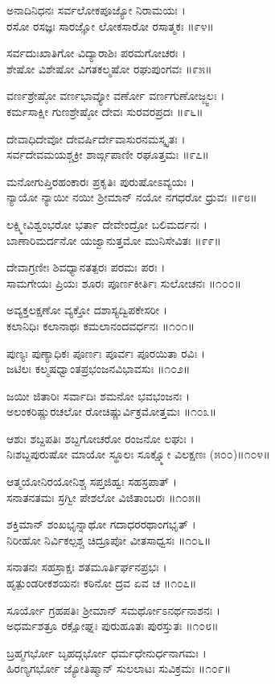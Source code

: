 ಅನಾದಿನಿಧನಃ ಸರ್ವಲೋಕಪೂಜ್ಯೋ ನಿರಾಮಯಃ ।\\
ರಸೋ ರಸಜ್ಞಃ ಸಾರಜ್ಞೋ ಲೋಕಸಾರೋ ರಸಾತ್ಮಕಃ ॥೯೪॥

ಸರ್ವದುಃಖಾತಿಗೋ ವಿದ್ಯಾರಾಶಿಃ ಪರಮಗೋಚರಃ ।\\
ಶೇಷೋ ವಿಶೇಷೋ ವಿಗತಕಲ್ಮಷೋ ರಘುಪುಂಗವಃ ॥೯೫॥

ವರ್ಣಶ್ರೇಷ್ಠೋ ವರ್ಣಭಾವ್ಯೋ ವರ್ಣೋ ವರ್ಣಗುಣೋಜ್ಜ್ವಲಃ ।\\
ಕರ್ಮಸಾಕ್ಷೀ ಗುಣಶ್ರೇಷ್ಠೋ ದೇವಃ ಸುರವರಪ್ರದಃ ॥೯೬॥

ದೇವಾಧಿದೇವೋ ದೇವರ್ಷಿರ್ದೇವಾಸುರನಮಸ್ಕೃತಃ ।\\
ಸರ್ವದೇವಮಯಶ್ಚಕ್ರೀ ಶಾರ್ಙ್ಗಪಾಣೀ ರಘೂತ್ತಮಃ ॥೯೭॥

ಮನೋಗುಪ್ತಿರಹಂಕಾರಃ ಪ್ರಕೃತಿಃ ಪುರುಷೋಽವ್ಯಯಃ ।\\
ನ್ಯಾಯೋ ನ್ಯಾಯೀ ನಯೀ ಶ್ರೀಮಾನ್ ನಯೋ ನಗಧರೋ ಧ್ರುವಃ ॥೯೮॥

ಲಕ್ಷ್ಮೀವಿಶ್ವಂಭರೋ ಭರ್ತಾ ದೇವೇಂದ್ರೋ ಬಲಿಮರ್ದನಃ ।\\
ಬಾಣಾರಿಮರ್ದನೋ ಯಜ್ವಾನುತ್ತಮೋ ಮುನಿಸೇವಿತಃ ॥೯೯॥

ದೇವಾಗ್ರಣೀಃ ಶಿವಧ್ಯಾನತತ್ಪರಃ ಪರಮಃ ಪರಃ ।\\
ಸಾಮಗೇಯಃ ಪ್ರಿಯಃ ಶೂರಃ ಪೂರ್ಣಕೀರ್ತಿಃ ಸುಲೋಚನಃ ॥೧೦೦॥

ಅವ್ಯಕ್ತಲಕ್ಷಣೋ ವ್ಯಕ್ತೋ ದಶಾಸ್ಯದ್ವಿಪಕೇಸರೀ ।\\
ಕಲಾನಿಧಿಃ ಕಲಾನಾಥಃ ಕಮಲಾನಂದವರ್ಧನಃ ॥೧೦೧॥

ಪುಣ್ಯಃ ಪುಣ್ಯಾಧಿಕಃ ಪೂರ್ಣಃ ಪೂರ್ವಃ ಪೂರಯಿತಾ ರವಿಃ ।\\
ಜಟಿಲಃ ಕಲ್ಮಷಧ್ವಾಂತಪ್ರಭಂಜನವಿಭಾವಸುಃ ॥೧೦೨॥

ಜಯೀ ಜಿತಾರಿಃ ಸರ್ವಾದಿಃ ಶಮನೋ ಭವಭಂಜನಃ ।\\
ಅಲಂಕರಿಷ್ಣುರಚಲೋ ರೋಚಿಷ್ಣುರ್ವಿಕ್ರಮೋತ್ತಮಃ ॥೧೦೩॥

ಆಶುಃ ಶಬ್ದಪತಿಃ ಶಬ್ದಗೋಚರೋ ರಂಜನೋ ಲಘುಃ ।\\
ನಿಃಶಬ್ದಪುರುಷೋ ಮಾಯೋ ಸ್ಥೂಲಃ ಸೂಕ್ಷ್ಮೋ ವಿಲಕ್ಷಣಃ (೫೦೦)॥೧೦೪॥

ಆತ್ಮಯೋನಿರಯೋನಿಶ್ಚ ಸಪ್ತಜಿಹ್ವಃ ಸಹಸ್ರಪಾತ್ ।\\
ಸನಾತನತಮಃ ಸ್ರಗ್ವೀ ಪೇಶಲೋ ವಿಜಿತಾಂಬರಃ ॥೧೦೫॥

ಶಕ್ತಿಮಾನ್ ಶಂಖಭೃನ್ನಾಥೋ ಗದಾಧರರಥಾಂಗಭೃತ್ ।\\
ನಿರೀಹೋ ನಿರ್ವಿಕಲ್ಪಶ್ಚ ಚಿದ್ರೂಪೋ ವೀತಸಾಧ್ವಸಃ ॥೧೦೬॥

ಸನಾತನಃ ಸಹಸ್ರಾಕ್ಷಃ ಶತಮೂರ್ತಿರ್ಘನಪ್ರಭಃ ।\\
ಹೃತ್ಪುಂಡರೀಕಶಯನಃ ಕಠಿನೋ ದ್ರವ ಏವ ಚ ॥೧೦೭॥

ಸೂರ್ಯೋ ಗ್ರಹಪತಿಃ ಶ್ರೀಮಾನ್ ಸಮರ್ಥೋಽನರ್ಥನಾಶನಃ ।\\
ಅಧರ್ಮಶತ್ರೂ ರಕ್ಷೋಘ್ನಃ ಪುರುಹೂತಃ ಪುರಸ್ತುತಃ ॥೧೦೮॥

ಬ್ರಹ್ಮಗರ್ಭೋ ಬೃಹದ್ಗರ್ಭೋ ಧರ್ಮಧೇನುರ್ಧನಾಗಮಃ ।\\
ಹಿರಣ್ಯಗರ್ಭೋ ಜ್ಯೋತಿಷ್ಮಾನ್ ಸುಲಲಾಟಃ ಸುವಿಕ್ರಮಃ ॥೧೦೯॥

